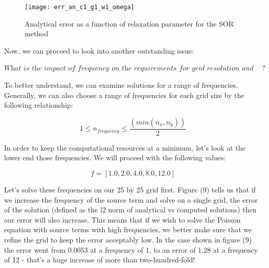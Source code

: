 \documentclass{article}
\begin{document}
\begin{figure}[H]
\centering
\texttt{[image: err\_an\_c1\_g1\_w1\_omega]}\label{error}
\caption{Analytical error as a function of relaxation parameter for the SOR method}
\end{figure}

\vspace{1em}

\noindent Now, we can proceed to look into another outstanding issue: \\

\vspace{0.5em}

\noindent $\textit{What is the impact of frequency on the requirements for grid resolution and convergence of the methods}?$ 

\vspace{1em}

\noindent To better understand, we can examine solutions for a  range of frequencies.  Generally, we can also choose a range of frequencies for each grid size by the following relationship:

\vspace{1 em}

\begin{equation}
1 \leq n_{frequency} \leq \frac{(min(n_{x},n_{y}))}{2} \nonumber
\end{equation}

\vspace{1em}

\noindent In order to keep the computational resources at a minimum, let's look at the lower end those frequencies. We will proceed with the following values:

\begin{equation}
f = [1.0, 2.0, 4.0, 8.0, 12.0] \nonumber
\end{equation}

\vspace{1em}

\noindent Let's solve these frequencies on our 25 by 25 grid first. Figure (9) tells us that if we increase the frequency of the source term and solve on a single grid, the error of the solution (defined as the  l2 norm of analytical vs computed solutions) then our error will also increase. This means that if we wish to solve the Poisson equation with source terms with high frequencies, we better make sure that we refine the grid to keep the error acceptably low. In the case shown in figure (9) the error went from 0.0053 at a frequency of 1, to an error of 1.28 at a frequency of 12 - that's a huge increase of more than two-hundred-fold!
\end{document}
